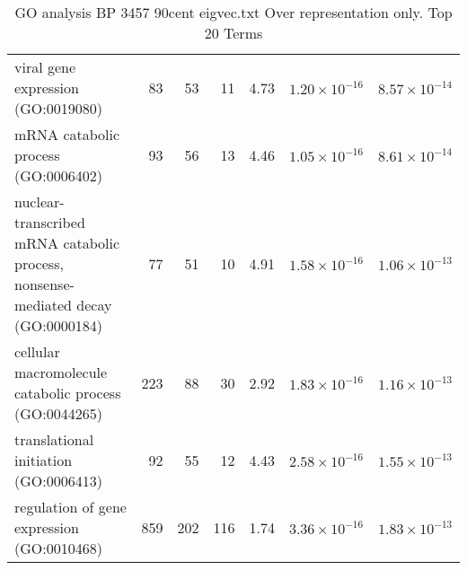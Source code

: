 \begin{table}[ht]
\begin{adjustbox}{width=\textwidth}
\begin{tabular}{lrrrlrr}
  viral gene expression (GO:0019080) & 83 & 53 & 11 & 4.73 & $1.20 \times 10^{-16}$ & $8.57 \times 10^{-14}$ \\ 
  mRNA catabolic process (GO:0006402) & 93 & 56 & 13 & 4.46 & $1.05 \times 10^{-16}$ & $8.61 \times 10^{-14}$ \\ 
  nuclear-transcribed mRNA catabolic process, nonsense-mediated decay (GO:0000184) & 77 & 51 & 10 & 4.91 & $1.58 \times 10^{-16}$ & $1.06 \times 10^{-13}$ \\ 
  cellular macromolecule catabolic process (GO:0044265) & 223 & 88 & 30 & 2.92 & $1.83 \times 10^{-16}$ & $1.16 \times 10^{-13}$ \\ 
  translational initiation (GO:0006413) & 92 & 55 & 12 & 4.43 & $2.58 \times 10^{-16}$ & $1.55 \times 10^{-13}$ \\ 
  regulation of gene expression (GO:0010468) & 859 & 202 & 116 & 1.74 & $3.36 \times 10^{-16}$ & $1.83 \times 10^{-13}$ \\ 
   \hline
\end{tabular}
\end{adjustbox}
\caption{GO analysis BP 3457 90cent eigvec.txt Over representation only. Top 20 Terms} 
\label{tab:GO analysis BP 3457 90cent eigvec.txt Over representation only. Top 20 Terms}
\end{table}



